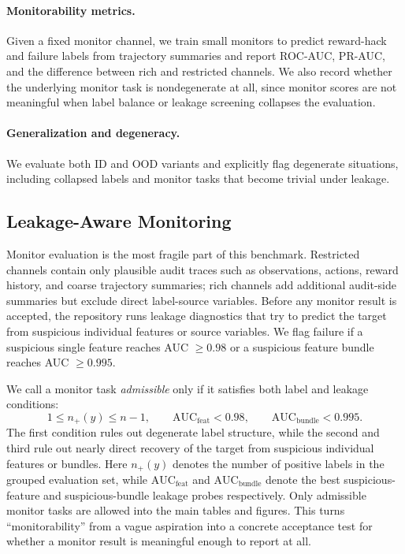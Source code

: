 \paragraph{Monitorability metrics.}
Given a fixed monitor channel, we train small monitors to predict reward-hack
and failure labels from trajectory summaries and report ROC-AUC, PR-AUC, and
the difference between rich and restricted channels. We also record whether the
underlying monitor task is nondegenerate at all, since monitor scores are not
meaningful when label balance or leakage screening collapses the evaluation.

\paragraph{Generalization and degeneracy.}
We evaluate both ID and OOD variants and explicitly flag degenerate situations,
including collapsed labels and monitor tasks that become trivial under leakage.

\subsection{Leakage-Aware Monitoring}
Monitor evaluation is the most fragile part of this benchmark. Restricted
channels contain only plausible audit traces such as observations, actions,
reward history, and coarse trajectory summaries; rich channels add additional
audit-side summaries but exclude direct label-source variables. Before any
monitor result is accepted, the repository runs leakage diagnostics that try to
predict the target from suspicious individual features or source variables. We
flag failure if a suspicious single feature reaches AUC $\ge 0.98$ or a
suspicious feature bundle reaches AUC $\ge 0.995$.

We call a monitor task \emph{admissible} only if it satisfies both label and
leakage conditions:
\[
1 \le n_{+}(y) \le n-1,\qquad
\mathrm{AUC}_{\mathrm{feat}} < 0.98,\qquad
\mathrm{AUC}_{\mathrm{bundle}} < 0.995.
\]
The first condition rules out degenerate label structure, while the second and
third rule out nearly direct recovery of the target from suspicious individual
features or bundles. Here $n_{+}(y)$ denotes the number of positive labels in
the grouped evaluation set, while $\mathrm{AUC}_{\mathrm{feat}}$ and
$\mathrm{AUC}_{\mathrm{bundle}}$ denote the best suspicious-feature and
suspicious-bundle leakage probes respectively. Only admissible monitor tasks
are allowed into the main tables and figures. This turns ``monitorability''
from a vague aspiration into a concrete acceptance test for whether a monitor
result is meaningful enough to report at all.

